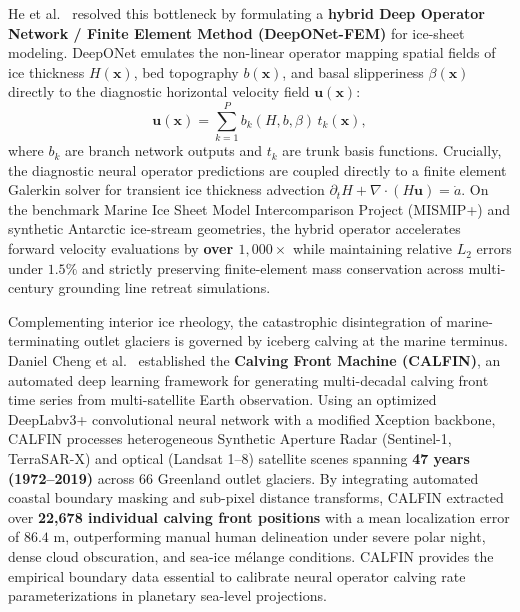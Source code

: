 He et al.~\cite{he2023hybrid} resolved this bottleneck by formulating a \textbf{hybrid Deep Operator Network / Finite Element Method (DeepONet-FEM)} for ice-sheet modeling. DeepONet emulates the non-linear operator mapping spatial fields of ice thickness $H(\mathbf{x})$, bed topography $b(\mathbf{x})$, and basal slipperiness $\beta(\mathbf{x})$ directly to the diagnostic horizontal velocity field $\mathbf{u}(\mathbf{x})$:
\begin{equation}
    \mathbf{u}(\mathbf{x}) = \sum_{k=1}^P b_k(H, b, \beta) \, t_k(\mathbf{x}),
    \label{eq:deeponet_ice}
\end{equation}
where $b_k$ are branch network outputs and $t_k$ are trunk basis functions. Crucially, the diagnostic neural operator predictions are coupled directly to a finite element Galerkin solver for transient ice thickness advection $\partial_t H + \nabla \cdot (H \mathbf{u}) = \dot{a}$. On the benchmark Marine Ice Sheet Model Intercomparison Project (MISMIP+) and synthetic Antarctic ice-stream geometries, the hybrid operator accelerates forward velocity evaluations by \textbf{over $1{,}000\times$} while maintaining relative $L_2$ errors under $1.5\%$ and strictly preserving finite-element mass conservation across multi-century grounding line retreat simulations.

Complementing interior ice rheology, the catastrophic disintegration of marine-terminating outlet glaciers is governed by iceberg calving at the marine terminus. Daniel Cheng et al.~\cite{cheng2021calfin} established the \textbf{Calving Front Machine (CALFIN)}, an automated deep learning framework for generating multi-decadal calving front time series from multi-satellite Earth observation. Using an optimized DeepLabv3+ convolutional neural network with a modified Xception backbone, CALFIN processes heterogeneous Synthetic Aperture Radar (Sentinel-1, TerraSAR-X) and optical (Landsat 1--8) satellite scenes spanning \textbf{47 years (1972--2019)} across 66 Greenland outlet glaciers. By integrating automated coastal boundary masking and sub-pixel distance transforms, CALFIN extracted over \textbf{22,678 individual calving front positions} with a mean localization error of \textbf{$86.4\text{ m}$}, outperforming manual human delineation under severe polar night, dense cloud obscuration, and sea-ice mélange conditions. CALFIN provides the empirical boundary data essential to calibrate neural operator calving rate parameterizations in planetary sea-level projections.

